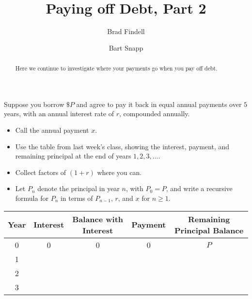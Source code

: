 \documentclass[handout,space,nooutcomes]{ximera}
\title{Paying off Debt, Part 2}
\author{Brad Findell \and Bart Snapp}
\begin{document}
\begin{abstract}
Here we continue to investigate where your payments go when you pay off debt.
\end{abstract}
\maketitle

\begin{question}[1in]
Suppose you borrow $\$P$ and agree to pay it back in equal annual
payments over $5$ years, with an annual interest rate of $r$, compounded annually.  

\begin{itemize}
\item Call the annual payment $x$.
\item Use the table from last week's class, showing the interest, payment, and remaining
principal at the end of years $1, 2, 3, \dots$.  
\item Collect factors of $(1+r)$ where you can.  
\item Let $P_n$ denote the principal in year $n$, with $P_0=P$, and write a recursive formula for $P_n$ in terms of $P_{n-1}$, $r$, and $x$ for $n\ge 1$.  
\end{itemize}




\def\arraystretch{2}
\begin{table}[h]
\begin{tabular}{|c|c|c|c|c|}
\hline
Year & Interest & Balance with Interest & Payment & Remaining Principal Balance \\ \hline
0    &   0     &       0            &   0    &  $P$                 \\ \hline
1    &          &                     &         &                             \\ \hline
2    &          &                     &         &                             \\ \hline
3    &          &                     &         &                             \\ \hline
\end{tabular}
\end{table}


\begin{freeResponse}
\end{freeResponse}
\end{question}
\end{document}
